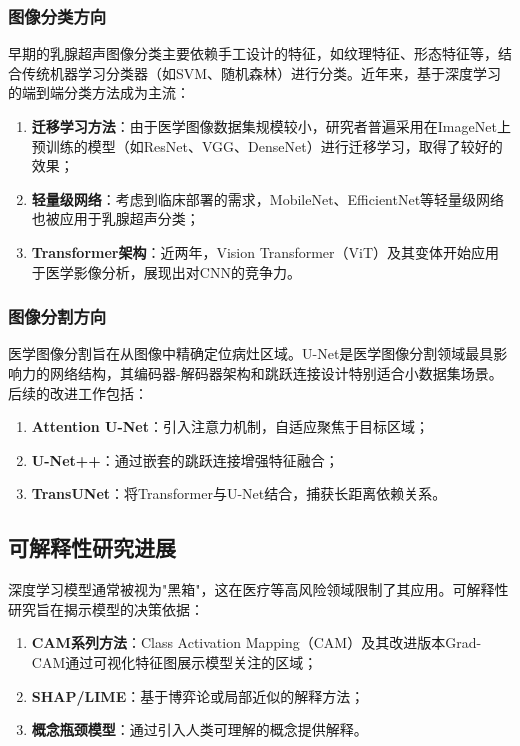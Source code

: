 \documentclass[supercite]{Hust-undergraduate-kaiti}
\theoremstyle{definition}
\begin{document}
\subsubsection{图像分类方向}

早期的乳腺超声图像分类主要依赖手工设计的特征，如纹理特征、形态特征等，结合传统机器学习分类器（如SVM、随机森林）进行分类。近年来，基于深度学习的端到端分类方法成为主流：

\begin{enumerate}
    \item \textbf{迁移学习方法}：由于医学图像数据集规模较小，研究者普遍采用在ImageNet上预训练的模型（如ResNet、VGG、DenseNet）进行迁移学习，取得了较好的效果；
    \item \textbf{轻量级网络}：考虑到临床部署的需求，MobileNet、EfficientNet等轻量级网络也被应用于乳腺超声分类；
    \item \textbf{Transformer架构}：近两年，Vision Transformer（ViT）\cite{ref3}及其变体开始应用于医学影像分析，展现出对CNN的竞争力。
\end{enumerate}

\subsubsection{图像分割方向}

医学图像分割旨在从图像中精确定位病灶区域。U-Net\cite{ref4}是医学图像分割领域最具影响力的网络结构，其编码器-解码器架构和跳跃连接设计特别适合小数据集场景。后续的改进工作包括：

\begin{enumerate}
    \item \textbf{Attention U-Net}：引入注意力机制，自适应聚焦于目标区域；
    \item \textbf{U-Net++}：通过嵌套的跳跃连接增强特征融合；
    \item \textbf{TransUNet}：将Transformer与U-Net结合，捕获长距离依赖关系。
\end{enumerate}

\subsection{可解释性研究进展}

深度学习模型通常被视为"黑箱"，这在医疗等高风险领域限制了其应用。可解释性研究旨在揭示模型的决策依据：

\begin{enumerate}
    \item \textbf{CAM系列方法}：Class Activation Mapping（CAM）及其改进版本Grad-CAM\cite{ref5}通过可视化特征图展示模型关注的区域；
    \item \textbf{SHAP/LIME}：基于博弈论或局部近似的解释方法；
    \item \textbf{概念瓶颈模型}：通过引入人类可理解的概念提供解释。
\end{enumerate}
\end{document}
